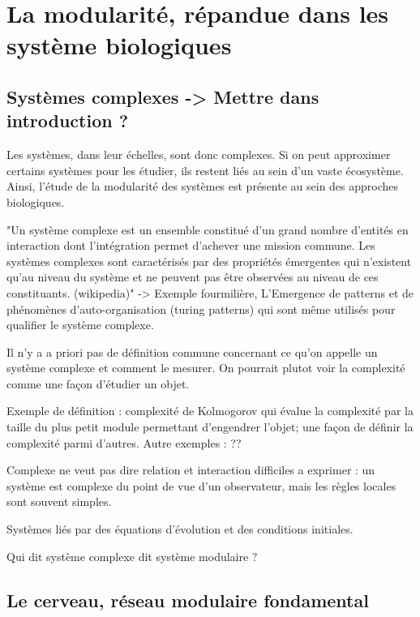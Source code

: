 

\section{La modularité, répandue dans les système biologiques}



\subsection{Systèmes complexes -> Mettre dans introduction ? }

Les systèmes, dans leur échelles, sont donc complexes. Si on peut approximer certains systèmes pour les étudier, ils restent liés au sein d'un vaste écosystème. Ainsi, l'étude de la modularité des systèmes est présente au sein des approches biologiques.

"Un système complexe est un ensemble constitué d'un grand nombre d'entités en interaction dont l'intégration permet d'achever une mission commune. Les systèmes complexes sont caractérisés par des propriétés émergentes qui n'existent qu'au niveau du système et ne peuvent pas être observées au niveau de ces constituants. (wikipedia)" -> Exemple fourmilière, 
L'Emergence de patterns et de phénomènes d'auto-organisation (turing patterns) \cite{turing52} qui sont même utilisés pour qualifier le système complexe. 

Il n'y a a priori pas de définition commune concernant ce qu'on appelle un système complexe et comment le mesurer. On pourrait plutot voir la complexité comme une façon d'étudier un objet. 

Exemple de définition : complexité de Kolmogorov qui évalue la complexité par la taille du plus petit module permettant d'engendrer l'objet; une façon de définir la complexité parmi d'autres. Autre exemples : ??

Complexe ne veut pas dire relation et interaction difficiles a exprimer : un système est complexe du point de vue d'un observateur, mais les règles locales sont souvent simples. 

Systèmes liés par des équations d'évolution et des conditions initiales. 

Qui dit système complexe dit système modulaire ?

\subsection{Le cerveau, réseau modulaire fondamental}

